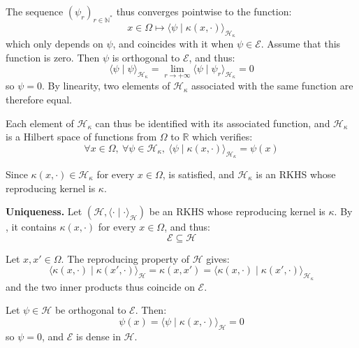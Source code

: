 The sequence $(\psi_r)_{r\in\mathbb{N}^*}$ thus converges pointwise to the function:
\begin{equation}
	x\in\Omega\mapsto\langle\psi\mid \kappa(x,\cdot)\rangle_{\mathcal{H}_\kappa}
\end{equation}
which only depends on $\psi$, and coincides with it when $\psi\in\mathcal{E}$. Assume that this function is zero. Then $\psi$ is orthogonal to $\mathcal{E}$, and thus:
\begin{equation}
	\langle\psi\mid\psi\rangle_{\mathcal{H}_\kappa}=\lim_{r\to+\infty}\langle\psi\mid\psi_r\rangle_{\mathcal{H}_\kappa}=0
\end{equation}
so $\psi=0$. By linearity, two elements of $\mathcal{H}_\kappa$ associated with the same function are therefore equal.

Each element of $\mathcal{H}_\kappa$ can thus be identified with its associated function, and $\mathcal{H}_\kappa$ is a Hilbert space of functions from $\Omega$ to $\mathbb{R}$ which verifies:
\begin{equation}
	\forall x\in\Omega,\:\forall\psi\in\mathcal{H}_\kappa,\:\langle\psi\mid \kappa(x,\cdot)\rangle_{\mathcal{H}_\kappa}=\psi(x)
\end{equation}

Since $\kappa(x,\cdot)\in\mathcal{H}_\kappa$ for every $x\in\Omega$,  is satisfied, and $\mathcal{H}_\kappa$ is an RKHS whose reproducing kernel is $\kappa$.

\textbf{Uniqueness.} Let $(\mathcal{H},\langle\cdot\mid\cdot\rangle_{\mathcal{H}})$ be an RKHS whose reproducing kernel is $\kappa$. By , it contains $\kappa(x,\cdot)$ for every $x\in\Omega$, and thus:
\begin{equation}
	\mathcal{E}\subseteq\mathcal{H}
\end{equation}

Let $x,x'\in\Omega$. The reproducing property of $\mathcal{H}$ gives:
\begin{equation}
	\langle \kappa(x,\cdot)\mid \kappa(x',\cdot)\rangle_{\mathcal{H}}=\kappa(x,x')=\langle \kappa(x,\cdot)\mid \kappa(x',\cdot)\rangle_{\mathcal{H}_\kappa}
\end{equation}
and the two inner products thus coincide on $\mathcal{E}$.

Let $\psi\in\mathcal{H}$ be orthogonal to $\mathcal{E}$. Then:
\begin{equation}
	\psi(x)=\langle\psi\mid \kappa(x,\cdot)\rangle_{\mathcal{H}}=0
\end{equation}
so $\psi=0$, and $\mathcal{E}$ is dense in $\mathcal{H}$.

